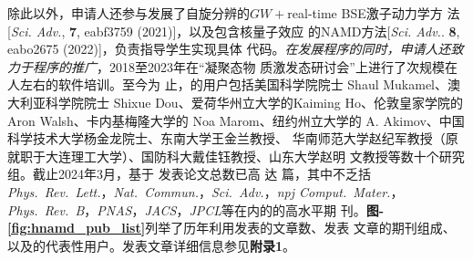 \begin{center}
\end{center}


除此以外，申请人还参与发展了自旋分辨的$GW{}+{}$real-time BSE激子动力学方
法[\textit{Sci. Adv.}, \textbf{7}, eabf3759 (2021)]，以及包含核量子效应
的NAMD方法[\textit{Sci. Adv.}. \textbf{8}, eabo2675 (2022)]，负责指导学生实现具体
代码。\emph{在发展程序的同时，申请人还致力于程序的推广}，2018至2023年在“凝聚态物
质激发态研讨会”上进行了次规模在人左右的软件培训。至今为
止，\hnamd{}的用户包括美国科学院院士 Shaul Mukamel、澳大利亚科学院院士 Shixue
Dou、爱荷华州立大学的Kaiming Ho、伦敦皇家学院的 Aron Walsh、卡内基梅隆大学的 Noa
Marom、纽约州立大学的 A. Akimov、中国科学技术大学杨金龙院士、东南大学王金兰教授、
华南师范大学赵纪军教授（原就职于大连理工大学）、国防科大戴佳钰教授、山东大学赵明
文教授等数十个研究组。截止2024年3月，基于 \hnamd{} 发表论文总数已高
达  篇，其中不乏括 \textit{Phys.\ Rev.\ Lett.}，\textit{Nat.\
  Commun.}，\textit{Sci.\ Adv.}，\textit{npj Comput.\ Mater.}，\textit{Phys.\
  Rev.\ B}，\textit{PNAS}，\textit{JACS}，\textit{JPCL}等在内的的高水平期
刊。\textbf{图-\ref{fig:hnamd_pub_list}}列举了历年利用\hnamd{}发表的文章数、发表
文章的期刊组成、以及\hnamd{}的代表性用户。发表文章详细信息参见\textbf{附录1}。
  

